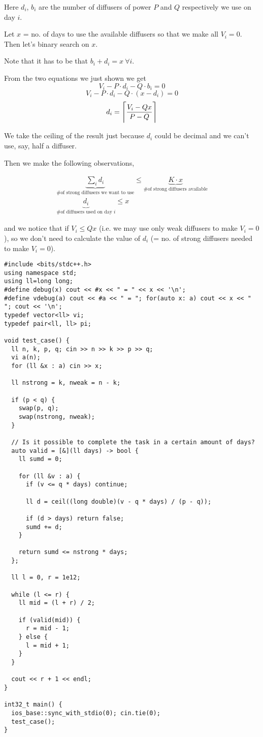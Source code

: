 Here $d_i$, $b_i$ are the number of diffusers of power $P$ and $Q$ respectively we use on day $i$. 

\begin{idea}
    Let $x$ = no. of days to use the available diffusers so that we make all $V_i = 0$. Then let's binary search on $x$.
\end{idea}

Note that it has to be that $b_i + d_i = x\ \forall i$.

From the two equations we just shown we get
$$ V_i - P \cdot d_i - Q \cdot b_i = 0 $$
$$ V_i - P \cdot d_i - Q \cdot (x - d_i) = 0$$
$$ d_i = \ceil[\Bigg]{\frac{V_i - Qx}{P - Q}} $$

We take the ceiling of the result just because $d_i$ could be decimal and we can't use, say, half a diffuser.

Then we make the following observations,

\begin{gather*}
\underbrace{\sum_i d_i}_{\text{\# of strong diffusers we want to use}} 
\leq 
\underbrace{K \cdot x}_{\text{\# of strong diffusers available}}
\\
\underbrace{d_i}_{\text{\# of diffusers used on day } i} \leq x
\end{gather*}

and we notice that if $V_i \leq Qx$ (i.e. we may use only weak diffusers to make $V_i = 0$), so we don't need to calculate the value of $d_i$ (= no. of strong diffusers needed to make $V_i = 0$).

\begin{verbatim}
#include <bits/stdc++.h>
using namespace std;
using ll=long long;
#define debug(x) cout << #x << " = " << x << '\n';
#define vdebug(a) cout << #a << " = "; for(auto x: a) cout << x << " "; cout << '\n';
typedef vector<ll> vi;
typedef pair<ll, ll> pi;

void test_case() {
  ll n, k, p, q; cin >> n >> k >> p >> q;
  vi a(n);
  for (ll &x : a) cin >> x;

  ll nstrong = k, nweak = n - k;
  
  if (p < q) {
    swap(p, q);
    swap(nstrong, nweak);
  }

  // Is it possible to complete the task in a certain amount of days?
  auto valid = [&](ll days) -> bool {
    ll sumd = 0;

    for (ll &v : a) {
      if (v <= q * days) continue;
      
      ll d = ceil((long double)(v - q * days) / (p - q));

      if (d > days) return false;
      sumd += d;
    }

    return sumd <= nstrong * days;
  };

  ll l = 0, r = 1e12; 
  
  while (l <= r) {
    ll mid = (l + r) / 2;

    if (valid(mid)) {
      r = mid - 1; 
    } else {
      l = mid + 1;
    }
  }

  cout << r + 1 << endl;
}

int32_t main() {
  ios_base::sync_with_stdio(0); cin.tie(0);
  test_case();
}
\end{verbatim}

